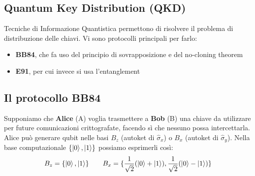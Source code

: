 \documentclass[../../InformazioneQuantistica.tex]{subfiles}
\begin{document}
\subsection{Quantum Key Distribution (QKD)}
Tecniche di Informazione Quantistica permettono di risolvere il problema di distribuzione delle chiavi. Vi sono protocolli principali per farlo:
\begin{itemize}
\item \textbf{BB84}, che fa uso del principio di sovrapposizione e del no-cloning theorem
\item \textbf{E91}, per cui invece si usa l'entanglement
\end{itemize}

\subsection{Il protocollo BB84}
Supponiamo che \textbf{Alice} (A) voglia trasmettere a \textbf{Bob} (B) una chiave da utilizzare per future comunicazioni crittografate, facendo sì che nessuno possa intercettarla.\\

Alice può generare qubit nelle basi $B_z$ (autoket di $\hat{\sigma}_x$) o $B_x$ (autoket di $\hat{\sigma}_y$). Nella base computazionale $\{\Ket{0}, \Ket{1}\}$ possiamo esprimerli così:
\begin{align*}
B_z = \{\Ket{0}, \Ket{1}\} \qquad B_x =\{ \frac{1}{\sqrt{2}}(\Ket{0}+\Ket{1}), \frac{1}{\sqrt{2}}(\Ket{0}-\Ket{1})\}
\end{align*}
\end{document}

